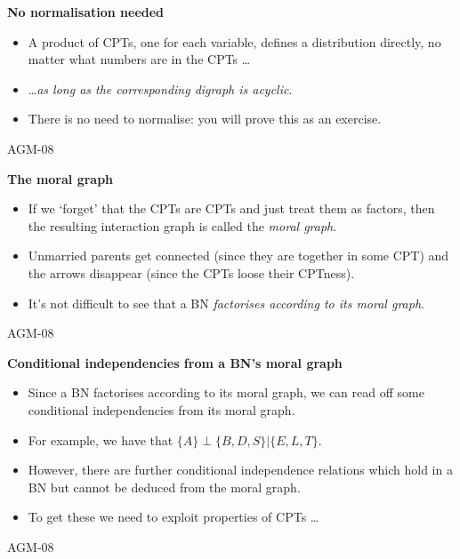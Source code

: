 \documentclass[landscape]{slides}
\newcommand{\lecnum}{AGM-08}
\newcommand{\slidehead}[1]{{\centering \bf #1 \\}}
\newenvironment{titledslide}[1]{\begin{slide}\slidehead{#1}\vfill}{\vfill \tiny \lecnum \end{slide}}
\newcommand{\ci}[3]{\ensuremath{#1 \perp #2 | #3}}
\begin{document}
\begin{titledslide}{No normalisation needed}
  
  \begin{itemize}
  \item A product of CPTs, one for each variable, defines a
    distribution directly, no matter what numbers are in the CPTs \dots
  \item \dots \emph{as long as the corresponding digraph is acyclic}.
  \item There is no need to normalise: you will prove this as an
    exercise.
  \end{itemize}

\end{titledslide}
\begin{titledslide}{The moral graph}
  
  \begin{itemize}
  \item If we `forget' that the CPTs are CPTs and just treat them as
    factors, then the resulting interaction graph is called the
    \emph{moral graph}.
  \item Unmarried parents get connected (since they are together in
    some CPT) and the arrows disappear (since the CPTs loose their CPTness).
  \item It's not difficult to see that a BN \emph{factorises according
    to its moral graph}.
  \end{itemize}

\end{titledslide}
\begin{titledslide}{Conditional independencies from a BN's moral graph}
  
  \begin{itemize}
  \item Since a BN factorises according to its moral graph, we can
    read off some conditional independencies from its moral graph.
  \item For example, we have that $\ci{\{A\}}{\{B,D,S\}}{\{E,L,T\}}$.
  \item However, there are further conditional independence relations
    which hold in a BN but cannot be deduced from the moral graph.
  \item To get these we need to exploit properties of CPTs \dots
  \end{itemize}

\end{titledslide}
\end{document}
